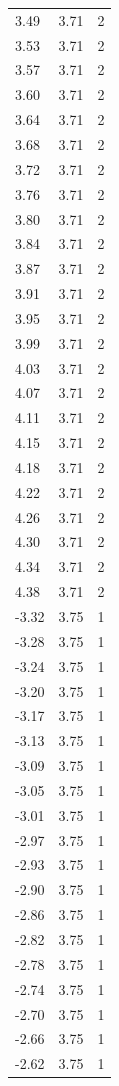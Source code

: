 \begin{longtable}{lrr}
  3.49 & 3.71 & 2 \\
  3.53 & 3.71 & 2 \\
  3.57 & 3.71 & 2 \\
  3.60 & 3.71 & 2 \\
  3.64 & 3.71 & 2 \\
  3.68 & 3.71 & 2 \\
  3.72 & 3.71 & 2 \\
  3.76 & 3.71 & 2 \\
  3.80 & 3.71 & 2 \\
  3.84 & 3.71 & 2 \\
  3.87 & 3.71 & 2 \\
  3.91 & 3.71 & 2 \\
  3.95 & 3.71 & 2 \\
  3.99 & 3.71 & 2 \\
  4.03 & 3.71 & 2 \\
  4.07 & 3.71 & 2 \\
  4.11 & 3.71 & 2 \\
  4.15 & 3.71 & 2 \\
  4.18 & 3.71 & 2 \\
  4.22 & 3.71 & 2 \\
  4.26 & 3.71 & 2 \\
  4.30 & 3.71 & 2 \\
  4.34 & 3.71 & 2 \\
  4.38 & 3.71 & 2 \\
  -3.32 & 3.75 & 1 \\
  -3.28 & 3.75 & 1 \\
  -3.24 & 3.75 & 1 \\
  -3.20 & 3.75 & 1 \\
  -3.17 & 3.75 & 1 \\
  -3.13 & 3.75 & 1 \\
  -3.09 & 3.75 & 1 \\
  -3.05 & 3.75 & 1 \\
  -3.01 & 3.75 & 1 \\
  -2.97 & 3.75 & 1 \\
  -2.93 & 3.75 & 1 \\
  -2.90 & 3.75 & 1 \\
  -2.86 & 3.75 & 1 \\
  -2.82 & 3.75 & 1 \\
  -2.78 & 3.75 & 1 \\
  -2.74 & 3.75 & 1 \\
  -2.70 & 3.75 & 1 \\
  -2.66 & 3.75 & 1 \\
  -2.62 & 3.75 & 1 \\

\end{longtable}

